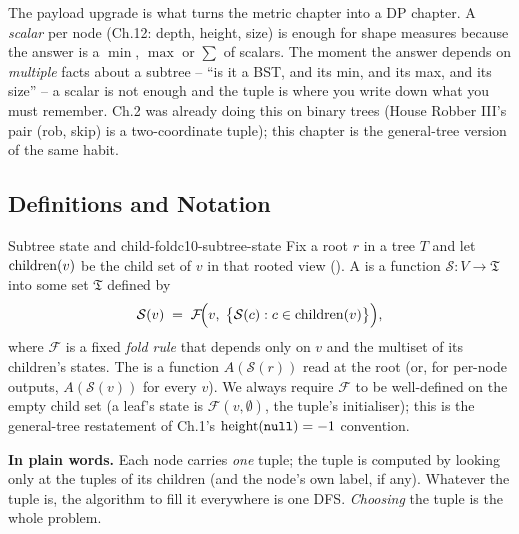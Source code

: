 The payload upgrade is what turns the metric chapter into a DP chapter.
A \emph{scalar} per node (Ch.12: depth, height, size) is enough for shape
measures because the answer is a $\min$, $\max$ or $\sum$ of scalars. The
moment the answer depends on \emph{multiple} facts about a subtree -- ``is it
a BST, and its min, and its max, and its size'' -- a scalar is not enough and
the tuple is where you write down what you must remember. Ch.2 was already
doing this on binary trees (House Robber III's pair (rob, skip) is a
two-coordinate tuple); this chapter is the general-tree version of the same
habit.

\subsection{Definitions and Notation}

\begin{definition}{Subtree state and child-fold}{c10-subtree-state}
Fix a root $r$ in a tree $T$ and let $\operatorname{children}(v)$ be the child set of $v$
in that rooted view (). A  is a
function $\mathcal S\colon V\to\mathfrak T$ into some set $\mathfrak T$
defined by
\[
  \mathcal S(v) \;=\; \mathcal F\!\Big(v,\;\big\{\mathcal S(c):c\in\operatorname{children}(v)\big\}\Big),
\]
where $\mathcal F$ is a fixed \emph{fold rule} that depends only on $v$ and
the multiset of its children's states. The  is a function
$A(\mathcal S(r))$ read at the root (or, for per-node outputs, $A(\mathcal S(v))$
for every $v$). We always require $\mathcal F$ to be well-defined on the empty
child set (a leaf's state is $\mathcal F(v,\emptyset)$, the tuple's
initialiser); this is the general-tree restatement of Ch.1's
$\operatorname{height}(\texttt{null})=-1$ convention.
\end{definition}

\noindent\textbf{In plain words.} Each node carries \emph{one} tuple; the
tuple is computed by looking only at the tuples of its children (and the
node's own label, if any). Whatever the tuple is, the algorithm to fill it
everywhere is one DFS. \emph{Choosing} the tuple is the whole problem.

